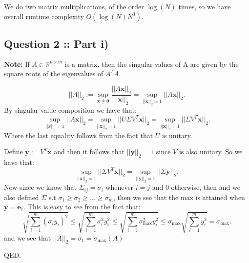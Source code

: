 \documentclass[a4paper]{article}
\begin{document}
We do two matrix multiplications, of the order $\log(N)$ times, so we have overall
runtime complexity $O(\log(N) N^3)$.

\subsection*{Question 2 :: Part i)}
\textbf{Note:} If $A \in \mathbb{R}^{n\times m}$ is a matrix, then the singular values of A are given
by the square roots of the eigenvalues of $A^T A$.

\[
||A||_2 := \sup_{\bm{x} \neq \bm{0}} \frac{||A \bm{x}||_2}{||\bm{x}||_2} = \sup_{||\bm{x}||_2 = 1} ||A \bm{x}||_2
.\]
By singular value composition we have that:
\[
\sup_{||x||_2 = 1} ||A \bm{x}||_2 = \sup_{||\bm{x}||_2 = 1} ||U \Sigma V^T \bm{x}||_2 =
\sup_{||\bm{x}||_2=1} || \Sigma V^T \bm{x}||_2
.\]
Where the last equality follows from the fact that $U$ is unitary.

Define $\bm{y} := V^T \bm{x}$ and then it follows that $||\bm{y}||_2=1$ since $V$ is also unitary.
So we have that:
\[
    \sup_{||\bm{x}||_2=1} ||\Sigma V^T \bm{x}||_2 = \sup_{||\bm{y}||_2=1} ||\Sigma \bm{y}||_2
.\]
Now since we know that $\Sigma_{ij} = \sigma_i$ whenever $i = j$ and  $0$ otherwise,
then and we also defined  $\Sigma$ s.t $\sigma_1 \ge \sigma_2 \ge ... \ge \sigma_m$,
then we see that the max is attained when $\bm{y} = \bm{e}_1$.
This is easy to see from the fact that:
\[
\sqrt{\sum_{i=1}^{m} (\sigma_i y_i)^2}  \le 
\sqrt{\sum_{i=1}^{m} \sigma_i^2 y_i^2} \le 
\sqrt{\sum_{i=1}^{m} \sigma_{\text{max}}^2 y_i^2} \le 
 \sigma_{\text{max}}  \sqrt{\sum_{i=1}^{m} y_i^2} =
\sigma_{\text{max}}
.\]
and we see that $||A||_2 = \sigma_1 = \sigma_{\text{max}}(A)$ 

QED.
\end{document}
